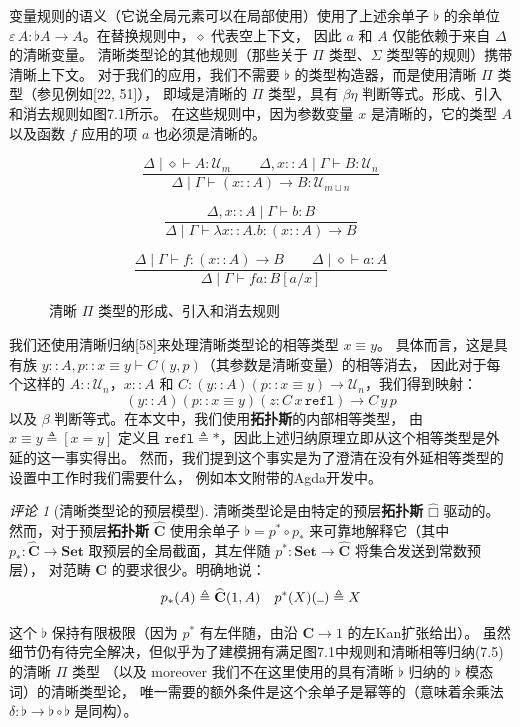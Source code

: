 \documentclass{ctexrep}
\theoremstyle{plain}
\theoremstyle{definition}
\theoremstyle{remark}
\newtheorem{remark}[theorem]{评论}
\newcommand\hatcube{\widehat{□}}
\newcommand{\ul}{{\rule[0ex]{0.5em}{0.4pt}}} %
\begin{document}
变量规则的语义（它说全局元素可以在局部使用）使用了上述余单子 $\flat$ 的余单位 
$\varepsilon\,A : \flat A \to A$。在替换规则中，$\diamond$ 代表空上下文，
因此 $a$ 和 $A$ 仅能依赖于来自 $\Delta$ 的清晰变量。
清晰类型论的其他规则（那些关于 $\Pi$ 类型、$\Sigma$ 类型等的规则）携带清晰上下文。
对于我们的应用，我们不需要 $\flat$ 的类型构造器，而是使用清晰 $\Pi$ 类型（参见例如[22, 51]），
即域是清晰的 $\Pi$ 类型，具有 $\beta\eta$ 判断等式。形成、引入和消去规则如图7.1所示。
在这些规则中，因为参数变量 $x$ 是清晰的，它的类型 $A$ 以及函数 $f$ 应用的项 $a$ 也必须是清晰的。
\begin{figure}[htbp]
\centering

\[
\frac{
    \Delta \mid \diamond \vdash A : \mathcal{U}_m \qquad 
    \Delta, x :: A \mid \Gamma \vdash B : \mathcal{U}_n
}{
    \Delta \mid \Gamma \vdash (x :: A) \to B : \mathcal{U}_{m \sqcup n}
}
\]

\[
\frac{
    \Delta, x :: A \mid \Gamma \vdash b : B
}{
    \Delta \mid \Gamma \vdash \lambda x :: A.b : (x :: A) \to B
}
\]

\[
\frac{
    \Delta \mid \Gamma \vdash f : (x :: A) \to B \qquad 
    \Delta \mid \diamond \vdash a : A
}{
    \Delta \mid \Gamma \vdash f a : B[a/x]
}
\]

\caption{清晰 $\Pi$ 类型的形成、引入和消去规则}
\label{fig:crisp-pi-rules}

\end{figure}

我们还使用清晰归纳[58]来处理清晰类型论的相等类型 $x \equiv y$。
具体而言，这是具有族 $y :: A, p :: x \equiv y \vdash C(y,p)$（其参数是清晰变量）的相等消去，
因此对于每个这样的 $A :: \mathcal{U}_n$，$x :: A$ 和 $C : (y :: A)(p :: x \equiv y) \to \mathcal{U}_n$，我们得到映射：
\begin{equation}
 (y :: A)(p :: x \equiv y)(z : C\,x\,\mathtt{refl}) \to C\,y\,p
\end{equation}
以及 $\beta$ 判断等式。在本文中，我们使用\textbf{拓扑斯}的内部相等类型，
由 $x \equiv y \triangleq [x = y]$ 定义且 $\mathtt{refl} \triangleq *$，因此上述归纳原理立即从这个相等类型是外延的这一事实得出。
然而，我们提到这个事实是为了澄清在没有外延相等类型的设置中工作时我们需要什么，
例如本文附带的Agda开发中。

\begin{remark}[清晰类型论的预层模型]
清晰类型论是由特定的预层\textbf{拓扑斯} $\hatcube$ 驱动的。
然而，对于预层\textbf{拓扑斯} $\widehat{\mathbf{C}}$ 使用余单子 
$\flat = p^* \circ p_*$ 来可靠地解释它（其中 $p_* : \widehat{\mathbf{C}} \to \mathbf{Set}$ 
取预层的全局截面，其左伴随 $p^* : \mathbf{Set} \to \widehat{\mathbf{C}}$ 将集合发送到常数预层），
对范畴 $\mathbf{C}$ 的要求很少。明确地说：
\[
p_*(A) \triangleq \widehat{\mathbf{C}}(1, A) \quad p^*(X)(\ul) \triangleq X
\]

这个 $\flat$ 保持有限极限（因为 $p^*$ 有左伴随，由沿 $\mathbf{C} \to 1$ 的左Kan扩张给出）。
虽然细节仍有待完全解决，但似乎为了建模拥有满足图7.1中规则和清晰相等归纳(7.5)的清晰 $\Pi$ 类型
（以及 moreover 我们不在这里使用的具有清晰 $\flat$ 归纳的 $\flat$ 模态词）的清晰类型论，
唯一需要的额外条件是这个余单子是幂等的（意味着余乘法 $\delta : \flat \to \flat \circ \flat$ 是同构）。
\end{remark}
\end{document}
